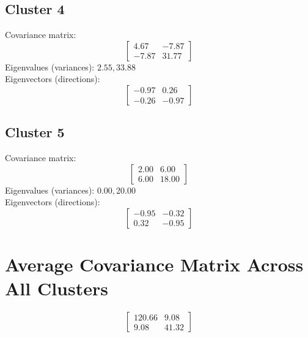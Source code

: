 \documentclass{article}
\begin{document}
\subsection*{Cluster 4}
Covariance matrix:
\[\begin{bmatrix}4.67 & -7.87 \\-7.87 & 31.77\end{bmatrix}\]
Eigenvalues (variances): $ 2.55, $33.88\\
Eigenvectors (directions):
\[\begin{bmatrix}-0.97 & 0.26 \\-0.26 & -0.97\end{bmatrix}\]
\subsection*{Cluster 5}
Covariance matrix:
\[\begin{bmatrix}2.00 & 6.00 \\6.00 & 18.00\end{bmatrix}\]
Eigenvalues (variances): $ 0.00, $20.00\\
Eigenvectors (directions):
\[\begin{bmatrix}-0.95 & -0.32 \\0.32 & -0.95\end{bmatrix}\]
\section*{Average Covariance Matrix Across All Clusters}
\[\begin{bmatrix}120.66 & 9.08 \\9.08 & 41.32\end{bmatrix}\]
\end{document}
